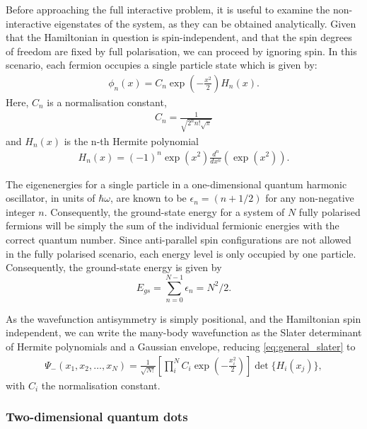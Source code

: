 Before approaching the full interactive problem, it is useful to examine the non-interactive eigenstates of the system, as they can be obtained analytically. Given that the Hamiltonian in question is spin-independent, and that the spin degrees of freedom are fixed by full polarisation, we can proceed by ignoring spin. In this scenario, each fermion occupies a single particle state which is given by: 
\begin{align*}
\phi_n(x) = C_n \exp\left(-\frac{x^2}{2}\right) H_n(x).
\end{align*}
Here, $C_n$ is a normalisation constant, 
\begin{align*}
C_n = \frac{1}{\sqrt{2^n n!\sqrt{\pi}}}
\end{align*}
and $H_n(x)$ is the n-th Hermite polynomial
\begin{align}
H_n(x) = (-1)^n \exp(x^2)\frac{d^n}{dx^n}\left(\exp(x^2)\right).
\label{eq:hermite}
\end{align}

The eigenenergies for a single particle in a one-dimensional quantum harmonic oscillator, in units of $\hbar \omega$, are known to be $\epsilon_n = (n + 1/2)$ for any non-negative integer $n$. Consequently, the ground-state energy for a system of $N$ fully polarised fermions will be simply the sum of the individual fermionic energies with the correct quantum number. Since anti-parallel spin configurations are not allowed in the fully polarised scenario, each energy level is only occupied by one particle.  Consequently, the ground-state energy is given by 
\begin{equation*}
    E_{gs} = \sum_{n=0}^{N-1} \epsilon_n = N^2/2.
\end{equation*}

As the wavefunction antisymmetry is simply positional, and the Hamiltonian spin independent, we can write the many-body wavefunction as the Slater determinant of Hermite polynomials and a Gaussian envelope, reducing \eqref{eq:general_slater} to
\begin{align*}
    \Psi_-(x_1, x_2, \ldots, x_N)  = \frac{1}{\sqrt{N!}}\left[\prod^N_i C_i \exp\left(-\frac{x_i^2}{2}\right)\right]\det\{H_i(x_j)\},
\end{align*}
with $C_i$ the normalisation constant.

\subsubsection{Two-dimensional quantum dots}

